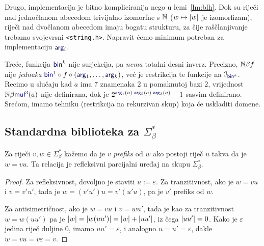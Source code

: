 Drugo, implementacija je bitno kompliciranija nego u lemi~\ref{lm:blh}. Dok su riječi nad jednočlanom abecedom trivijalno izomorfne s ${\mathbb N}$ ($w\mapsto\lvert w\rvert$ je izomorfizam), riječi nad dvočlanom abecedom imaju bogatu strukturu, za čije raščlanjivanje trebamo svojevrsni \texttt{<string.h>}. Napravit ćemo minimum potreban za implementaciju $\f{arg}_i$.

Treće, funkcija $\f{bin}^k$ nije surjekcija, pa \emph{nema} totalni desni inverz. Precizno, ${\mathbb N}\beta f$ nije \emph{jednaka} $\f{bin}^1\circ f\circ(\f{arg}_1,\dotsc,\f{arg}_k)$, već je restrikcija te funkcije na $\im{\f{bin}^k}$. %
Recimo u slučaju kad $a$ ima $7$ znamenaka $2$ u pomaknutoj bazi $2$, vrijednost $\N\beta\f{mul}^3(a)$ nije definirana, dok je $2^{\f{arg}_1(a)\cdot\f{arg}_2(a)\cdot\f{arg}_3(a)}-1$ sasvim definirano. Srećom, imamo tehniku (restrikcija na rekurzivan skup) koja će uskladiti domene.

\subsection{Standardna biblioteka za \texorpdfstring{$\Sigma_\beta^*$}{binarne stringove}}\label{sec:stdstring}

\begin{propozicija}[{name=["biti prefiks" je parcijalni uređaj]}]\label{pp:prefiksrpu}
Za riječi $v,w\in\Sigma_\beta^*$ kažemo da je $v$ \emph{prefiks} od $w$ ako postoji riječ $u$ takva da je $w=vu$.
Ta relacija je refleksivni parcijalni uređaj na skupu $\Sigma_\beta^*$.
\end{propozicija}
\begin{proof}
Za refleksivnost, dovoljno je staviti $u:=\varepsilon$. Za tranzitivnost, ako je $w=vu$ i $v=v'u'$, tada je $w=(v'u')u=v'(u'u)$, pa je $v'$ prefiks od $w$.

Za antisimetričnost, ako je $w=vu$ i $v=wu'$, tada je kao za tranzitivnost $w=w(uu')$ pa je $\lvert w\rvert=\lvert w(uu')\rvert=\lvert w\rvert+\lvert uu'\rvert$, iz čega $\lvert uu'\rvert=0$. Kako je $\varepsilon$ jedina riječ duljine $0$, imamo $uu'=\varepsilon$, i analogno $u=u'=\varepsilon$, dakle $w=vu=v\varepsilon=v$.
\end{proof}

